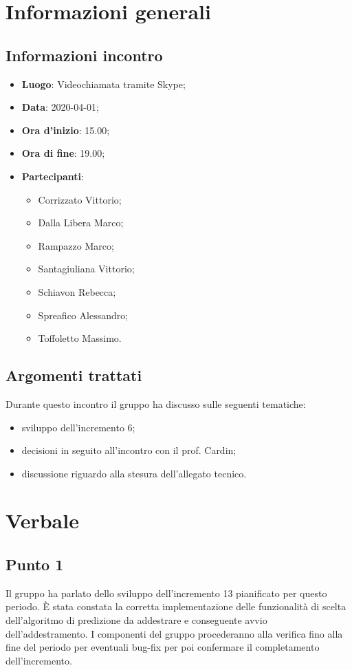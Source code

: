 \section{Informazioni generali}
    \subsection{Informazioni incontro}
        \begin{itemize}
            \item \textbf{Luogo}: Videochiamata tramite Skype;
            \item \textbf{Data}: 2020-04-01;
            \item \textbf{Ora d'inizio}: 15.00;
            \item \textbf{Ora di fine}: 19.00;
            \item \textbf{Partecipanti}: \begin{itemize}
                \item Corrizzato Vittorio;
                \item Dalla Libera Marco;
                \item Rampazzo Marco;
                \item Santagiuliana Vittorio;
                \item Schiavon Rebecca;
                \item Spreafico Alessandro;
                \item Toffoletto Massimo.
            \end{itemize}
        \end{itemize}
    \subsection{Argomenti trattati}
        Durante questo incontro il gruppo ha discusso sulle seguenti tematiche:
        \begin{itemize}
            \item sviluppo dell'incremento 6;
            \item decisioni in seguito all'incontro con il prof. Cardin;
            \item discussione riguardo alla stesura dell'allegato tecnico.
        \end{itemize}
\section{Verbale}
    \subsection{Punto 1}
        Il gruppo ha parlato dello sviluppo dell'incremento 13 pianificato per questo periodo. È stata constata la corretta implementazione delle funzionalità di scelta dell'algoritmo di predizione da addestrare e conseguente avvio dell'addestramento. I componenti del gruppo procederanno alla verifica fino alla fine del periodo per eventuali bug-fix per poi confermare il completamento dell'incremento.

